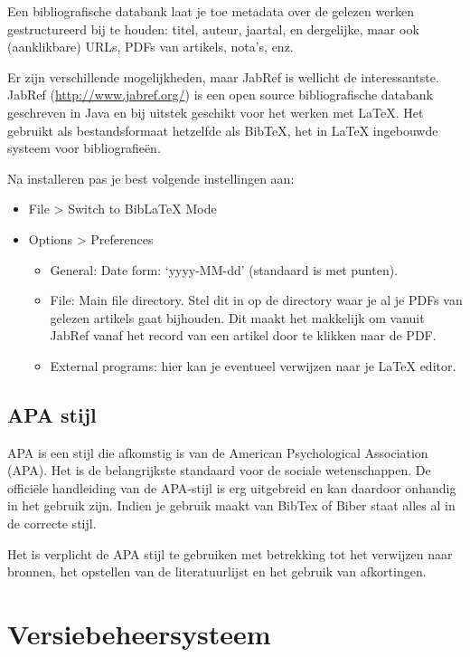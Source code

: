 Een bibliografische databank laat je toe metadata over de gelezen werken gestructureerd bij te houden: titel, auteur, jaartal, en dergelijke, maar ook (aanklikbare) URLs, PDFs van artikels, nota's, enz.

Er zijn verschillende mogelijkheden, maar JabRef is wellicht de interessantste. JabRef (\url{http://www.jabref.org/}) is een open source bibliografische databank geschreven in Java en bij uitstek geschikt voor het werken met {\LaTeX}. Het gebruikt als bestandsformaat hetzelfde als Bib{\TeX}, het in {\LaTeX} ingebouwde systeem voor bibliografieën.

Na installeren pas je best volgende instellingen aan:

\begin{itemize}
  \item File > Switch to BibLaTeX Mode
  \item Options > Preferences
    \begin{itemize}
      \item General: Date form: `yyyy-MM-dd' (standaard is met punten).
      \item File: Main file directory. Stel dit in op de directory waar je al je PDFs van gelezen artikels gaat bijhouden. Dit maakt het makkelijk om vanuit JabRef vanaf het record van een artikel door te klikken naar de PDF.
      \item External programs: hier kan je eventueel verwijzen naar je {\LaTeX} editor.
    \end{itemize}
\end{itemize}

\subsection{APA stijl}
APA is een stijl die afkomstig is van de American Psychological Association (APA). Het is de belangrijkste standaard voor de sociale wetenschappen. De officiële handleiding van de APA-stijl is erg uitgebreid en kan daardoor onhandig in het gebruik zijn. Indien je gebruik maakt van BibTex of Biber staat alles al in de correcte stijl.
\begin{framed}
	Het is verplicht de APA stijl te gebruiken met betrekking tot het verwijzen naar bronnen, het opstellen van de literatuurlijst en het gebruik van afkortingen.
\end{framed}

\section{Versiebeheersysteem}
\label{sec:versiebeheersysteem}

